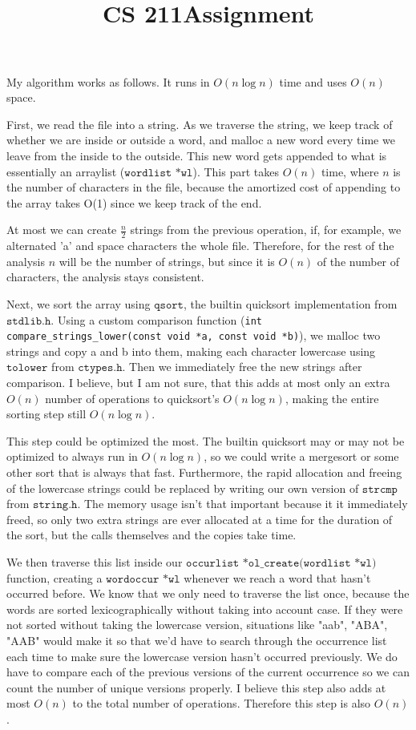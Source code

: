 \documentclass[11pt]{article}
\title{\vspace{-50pt}
\Huge \name
\\\vspace{20pt}
\huge CS 211\hfill Assignment \hw}
\author{}
\date{}
\theoremstyle{quest}
\begin{document}
\maketitle

My algorithm works as follows. It runs in $O(n\log n)$ time and uses $O(n)$ space.

First, we read the file into a string. As we traverse the string, we keep track of whether we are inside or outside a word, and malloc a new word every time we leave from the inside to the outside. This new word gets appended to what is essentially an arraylist ($\texttt{wordlist *wl}$). This part takes $O(n)$ time, where $n$ is the number of characters in the file, because the amortized cost of appending to the array takes O(1) since we keep track of the end.

At most we can create $\frac{n}{2}$ strings from the previous operation, if, for example, we alternated 'a' and space characters the whole file. Therefore, for the rest of the analysis $n$ will be the number of strings, but since it is $O(n)$ of the number of characters, the analysis stays consistent.

Next, we sort the array using $\texttt{qsort}$, the builtin quicksort implementation from $\texttt{stdlib.h}$. Using a custom comparison function (\texttt{int compare\_strings\_lower(const void *a, const void *b)}), we malloc two strings and copy a and b into them, making each character lowercase using $\texttt{tolower}$ from $\texttt{ctypes.h}$. Then we immediately free the new strings after comparison. I believe, but I am not sure, that this adds at most only an extra $O(n)$ number of operations to quicksort's $O(n\log n)$, making the entire sorting step still $O(n\log n)$.

This step could be optimized the most. The builtin quicksort may or may not be optimized to always run in $O(n\log n)$, so we could write a mergesort or some other sort that is always that fast. Furthermore, the rapid allocation and freeing of the lowercase strings could be replaced by writing our own version of $\texttt{strcmp}$ from $\texttt{string.h}$. The memory usage isn't that important because it it immediately freed, so only two extra strings are ever allocated at a time for the duration of the sort, but the calls themselves and the copies take time.

We then traverse this list inside our $\texttt{occurlist *ol\_create(wordlist *wl)}$ function, creating a $\texttt{wordoccur *wl}$ whenever we reach a word that hasn't occurred before. We know that we only need to traverse the list once, because the words are sorted lexicographically without taking into account case. If they were not sorted without taking the lowercase version, situations like "aab", "ABA", "AAB" would make it so that we'd have to search through the occurrence list each time to make sure the lowercase version hasn't occurred previously. We do have to compare each of the previous versions of the current occurrence so we can count the number of unique versions properly. I believe this step also adds at most $O(n)$ to the total number of operations. Therefore this step is also $O(n)$.
\end{document}

